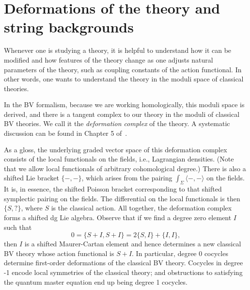\section{Deformations of the theory and string backgrounds}
\label{sec: moduli}




Whenever one is studying a theory,
it is helpful to understand how it can be modified 
and how features of the theory change as one adjusts natural parameters of the theory,
such as coupling constants of the action functional.
In other words, one wants to understand the theory in the moduli space of classical theories.

In the BV formalism, because we are working homologically, this moduli space is derived,
and there is a tangent complex to our theory in the moduli of classical BV theories.
We call it the {\em deformation complex} of the theory.
A systematic discussion can be found in Chapter 5 of~\cite{CosBook}.

As a gloss, the underlying graded vector space of this deformation complex consists of the local functionals on the fields, i.e., Lagrangian densities. 
(Note that we allow local functionals of arbitrary cohomological degree.) 
There is also a shifted Lie bracket $\{-,-\}$, 
which arises from the pairing $\int_\Sigma \langle-,-\rangle$ on the fields.
It is, in essence, the shifted Poisson bracket corresponding to that shifted symplectic pairing on the fields.
The differential on the local functionals is then $\{S,?\}$, where $S$ is the classical action. 
All together, the deformation complex forms a shifted dg Lie algebra. 
Observe that if we find a degree zero element $I$ such that
\[
0=\{S +I,S +I\}=2\{S,I\}+\{I,I\},
\]
then $I$ is a shifted Maurer-Cartan element and 
hence determines a new classical BV theory whose action functional is $S + I$. 
In particular, degree 0 cocycles determine first-order deformations of the classical BV theory. Cocycles in degree -1 encode local symmetries of the classical theory; 
and obstructions to satisfying the quantum master equation end up being degree 1 cocycles.

